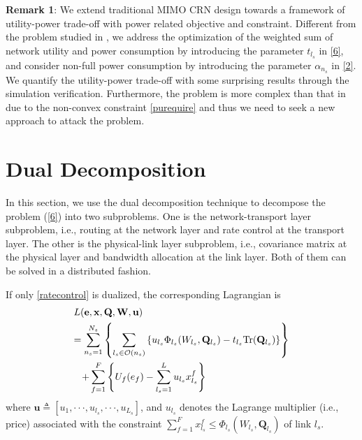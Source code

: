 \documentclass[12pt,onecolumn,tworows]{IEEEtran}
\begin{document}
\textbf{Remark 1}:
We extend traditional MIMO CRN design towards a framework of utility-power trade-off with power related objective and constraint. Different from the problem studied in \cite{LiuJSAC2008}, we address the optimization of the weighted sum of network utility and power consumption by introducing the parameter $t_{l_s}$  in \eqref{6},
and consider non-full power consumption by introducing the parameter $\alpha_{n_s}$ in \eqref{2}. We quantify the utility-power trade-off with some surprising results through the simulation verification. Furthermore, the problem is more complex than that in \cite{LiuJSAC2008} due to the non-convex constraint \eqref{purequire} and thus we need to seek a new approach to attack the problem.

\section{Dual Decomposition}
 In this section, we use the dual decomposition technique
to decompose the problem (\ref{6}) into two subproblems. One is the network-transport layer subproblem, i.e., routing at the network layer and rate control at the transport layer.
The other is the physical-link layer subproblem, i.e.,  covariance matrix at the physical layer and bandwidth allocation at the link layer. Both of them can be solved in a distributed fashion.

If only \eqref{ratecontrol} is dualized, the corresponding Lagrangian is
\begin{equation}\label{7}
\begin{gathered}
  L({\mathbf{e}},{\mathbf{x}},{\mathbf{Q,W}},{\mathbf{u}}) \hfill \\
   = \sum\limits_{{n_s} = 1}^{N_s} {\left\{ {\sum\limits_{{l_s} \in \mathcal{O}({n_s})} {\left\{ {{u_{{l_s}}}{\Phi _{{l_s}}}({W_{{l_s}}},{{\mathbf{Q}}_{{l_s}}}) - {t_{{l_s}}}\text{Tr}({{\mathbf{Q}}_{{l_s}}})} \right\}} } \right\}}  \hfill \\
  \;\;\; + \sum\limits_{f = 1}^F {\left\{ {U_f({{e}_f}) - \sum\limits_{{l_s} = 1}^L {u_{l_s}x_{l_s}^f}} \right\}}  \hfill \\
\end{gathered}
\end{equation}
where ${\mathbf{u}} \triangleq [{u_1}, \cdot\cdot\cdot, {u_{l_s}}, \cdot\cdot\cdot ,{u_{L_s}}]$, and $u_{l_s}$ denotes the Lagrange multiplier (i.e., price) associated with the constraint $\sum_{f = 1}^F {x_{{l_s}}^f \leqslant {\Phi _{{l_s}}}({W_{{l_s}}},{{\mathbf{Q}}_{{l_s}}})}$ of link ${l_s}$.
\end{document}
